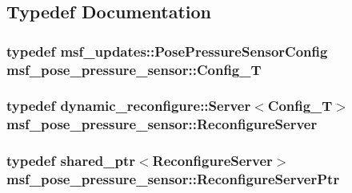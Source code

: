 \subsection{Typedef Documentation}
\hypertarget{namespacemsf__pose__pressure__sensor_a2c4cfe42f9dab2046f445854ea6e36b8}{
\subsubsection[{Config\-\_\-\-T}]{\setlength{\rightskip}{0pt plus 5cm}typedef msf\-\_\-updates\-::\-Pose\-Pressure\-Sensor\-Config {\bf msf\-\_\-pose\-\_\-pressure\-\_\-sensor\-::\-Config\-\_\-\-T}}}\label{namespacemsf__pose__pressure__sensor_a2c4cfe42f9dab2046f445854ea6e36b8}
\hypertarget{namespacemsf__pose__pressure__sensor_ad27bcff9b153b9f261ebd07114344368}{
\subsubsection[{Reconfigure\-Server}]{\setlength{\rightskip}{0pt plus 5cm}typedef dynamic\-\_\-reconfigure\-::\-Server$<${\bf Config\-\_\-\-T}$>$ {\bf msf\-\_\-pose\-\_\-pressure\-\_\-sensor\-::\-Reconfigure\-Server}}}\label{namespacemsf__pose__pressure__sensor_ad27bcff9b153b9f261ebd07114344368}
\hypertarget{namespacemsf__pose__pressure__sensor_a76e4a89437dafa8944e50322b9d93903}{
\subsubsection[{Reconfigure\-Server\-Ptr}]{\setlength{\rightskip}{0pt plus 5cm}typedef shared\-\_\-ptr$<${\bf Reconfigure\-Server}$>$ {\bf msf\-\_\-pose\-\_\-pressure\-\_\-sensor\-::\-Reconfigure\-Server\-Ptr}}}\label{namespacemsf__pose__pressure__sensor_a76e4a89437dafa8944e50322b9d93903}
